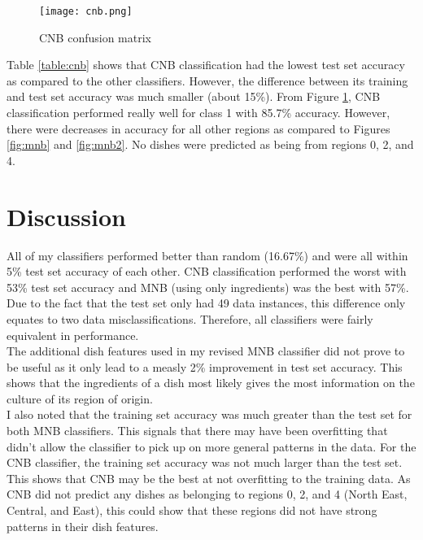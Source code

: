 \documentclass[12pt]{article}
\begin{document}
\begin{figure}[H]
   \centering
   \texttt{[image: cnb.png]}
   \caption{CNB confusion matrix}
   \label{fig:cnb}
\end{figure}

\noindent Table \ref{table:cnb} shows that CNB classification had the lowest test set accuracy as compared to the other classifiers. However, the difference between its training and test set accuracy was much smaller (about 15\%). From Figure \ref{fig:cnb}, CNB classification performed really well for class 1 with 85.7\% accuracy. However, there were decreases in accuracy for all other regions as compared to Figures \ref{fig:mnb} and \ref{fig:mnb2}. No dishes were predicted as being from regions 0, 2, and 4.

\section{Discussion}

\noindent All of my classifiers performed better than random (16.67\%) and were all within 5\% test set accuracy of each other. CNB classification performed the worst with 53\% test set accuracy and MNB (using only ingredients) was the best with 57\%. Due to the fact that the test set only had 49 data instances, this difference only equates to two data misclassifications. Therefore, all classifiers were fairly equivalent in performance.\\

\noindent The additional dish features used in my revised MNB classifier did not prove to be useful as it only lead to a measly 2\% improvement in test set accuracy. This shows that the ingredients of a dish most likely gives the most information on the culture of its region of origin.\\

\noindent I also noted that the training set accuracy was much greater than the test set for both MNB classifiers. This signals that there may have been overfitting that didn't allow the classifier to pick up on more general patterns in the data. For the CNB classifier, the training set accuracy was not much larger than the test set. This shows that CNB may be the best at not overfitting to the training data.
As CNB did not predict any dishes as belonging to regions 0, 2, and 4 (North East, Central, and East), this could show that these regions did not have strong patterns in their dish features.\\
\end{document}
